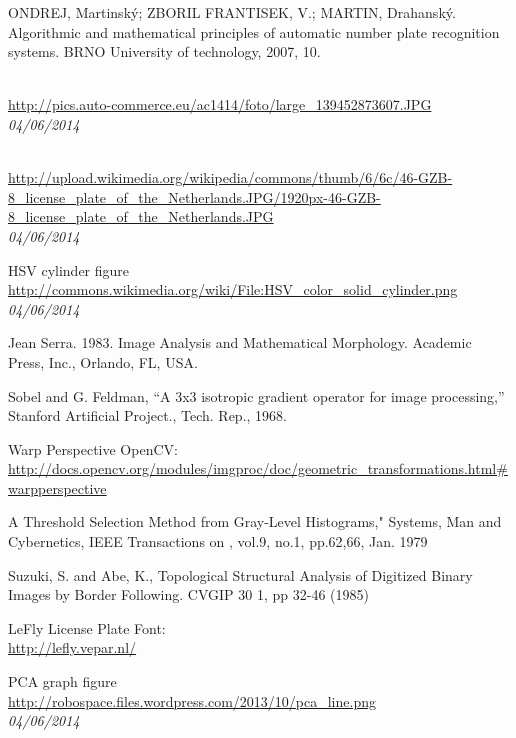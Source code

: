 
\begin{thebibliography}{99}

 ONDREJ, Martinský; ZBORIL FRANTISEK, V.; MARTIN, Drahanský. 
Algorithmic and mathematical principles of automatic number plate recognition systems. 
BRNO University of technology, 2007, 10.

 \\
	\url{http://pics.auto-commerce.eu/ac1414/foto/large_139452873607.JPG} \\
	\textit{04/06/2014}

 \\
	\url{http://upload.wikimedia.org/wikipedia/commons/thumb/6/6c/46-GZB-8_license_plate_of_the_Netherlands.JPG/1920px-46-GZB-8_license_plate_of_the_Netherlands.JPG} \\
	\textit{04/06/2014}

 HSV cylinder figure \\
	\url{http://commons.wikimedia.org/wiki/File:HSV_color_solid_cylinder.png} \\
	\textit{04/06/2014}

 Jean Serra. 1983. Image Analysis and Mathematical Morphology. Academic Press, Inc., Orlando, FL, USA.

 Sobel and G. Feldman, “A 3x3 isotropic gradient operator for image processing,” Stanford Artificial Project., Tech. Rep., 1968.

 Warp Perspective OpenCV:\\
	\url{http://docs.opencv.org/modules/imgproc/doc/geometric_transformations.html#warpperspective}

 A Threshold Selection Method from Gray-Level Histograms," Systems, Man and Cybernetics, IEEE Transactions on , vol.9, no.1, pp.62,66, Jan. 1979

 Suzuki, S. and Abe, K., Topological Structural Analysis of Digitized Binary Images by Border Following. CVGIP 30 1, pp 32-46 (1985)

 LeFly License Plate Font:\\
	\url{http://lefly.vepar.nl/}

 PCA graph figure \\
	\url{http://robospace.files.wordpress.com/2013/10/pca_line.png} \\
	\textit{04/06/2014}

\end{thebibliography}

\vfill
